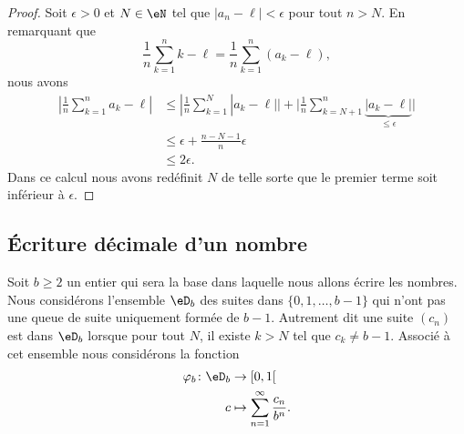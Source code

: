 \begin{proof}
    Soit \( \epsilon>0\) et \( N\in \eN\) tel que \( | a_n-\ell |<\epsilon\) pour tout \( n>N\). En remarquant que
    \begin{equation}
        \frac{1}{ n }\sum_{k=1}^nk-\ell=\frac{1}{ n }\sum_{k=1}^n(a_k-\ell),
    \end{equation}
    nous avons
    \begin{subequations}
        \begin{align}
            | \frac{1}{ n }\sum_{k=1}^na_k-\ell |&\leq| \frac{1}{ n }\sum_{k=1}^N| a_k-\ell | |+\big| \frac{1}{ n }\sum_{k=N+1}^n\underbrace{| a_k-\ell |}_{\leq \epsilon} \big|\\
            &\leq \epsilon+\frac{ n-N-1 }{ n }\epsilon\\
            &\leq 2\epsilon.
        \end{align}
    \end{subequations}
    Dans ce calcul nous avons redéfinit \( N\) de telle sorte que le premier terme soit inférieur à \( \epsilon\).
\end{proof}

\subsection{Écriture décimale d'un nombre}

Soit \( b\geq 2\) un entier qui sera la base dans laquelle nous allons écrire les nombres. Nous considérons l'ensemble \( \eD_b\) des suites dans \( \{ 0,1,\ldots, b-1 \}\) qui n'ont pas une queue de suite uniquement formée de \( b-1\). Autrement dit une suite \( (c_n)\) est dans \( \eD_b\) lorsque pour tout \( N\), il existe \( k>N\) tel que \( c_k\neq b-1\). Associé à cet ensemble nous considérons la fonction
\begin{equation}    \label{EqXXXooOTsCK}
    \begin{aligned}
        \varphi_b\colon \eD_b&\to \mathopen[ 0 , 1 [ \\
            c&\mapsto \sum_{n=1}^{\infty}\frac{ c_n }{ b^n }. 
    \end{aligned}
\end{equation}

